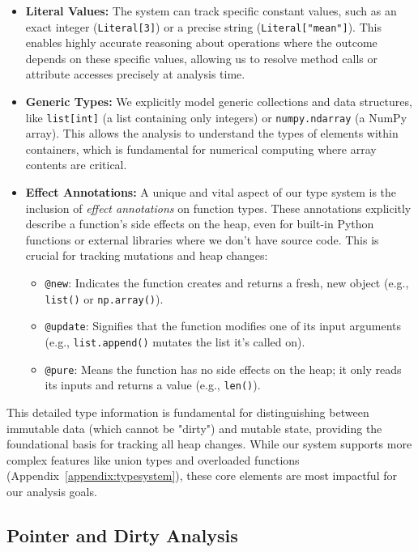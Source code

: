\begin{itemize}
    \item \textbf{Literal Values:} The system can track specific constant values, such as an exact integer (\texttt{Literal[3]}) or a precise string (\texttt{Literal["mean"]}). This enables highly accurate reasoning about operations where the outcome depends on these specific values, allowing us to resolve method calls or attribute accesses precisely at analysis time.
    \item \textbf{Generic Types:} We explicitly model generic collections and data structures, like \texttt{list[int]} (a list containing only integers) or \texttt{numpy.ndarray} (a NumPy array). This allows the analysis to understand the types of elements within containers, which is fundamental for numerical computing where array contents are critical.
    \item \textbf{Effect Annotations:} A unique and vital aspect of our type system is the inclusion of \emph{effect annotations} on function types. These annotations explicitly describe a function's side effects on the heap, even for built-in Python functions or external libraries where we don't have source code. This is crucial for tracking mutations and heap changes:
    \begin{itemize}
        \item \texttt{@new}: Indicates the function creates and returns a fresh, new object (e.g., \texttt{list()} or \texttt{np.array()}).
        \item \texttt{@update}: Signifies that the function modifies one of its input arguments (e.g., \texttt{list.append()} mutates the list it's called on).
        \item \texttt{@pure}: Means the function has no side effects on the heap; it only reads its inputs and returns a value (e.g., \texttt{len()}).
    \end{itemize}
\end{itemize}
This detailed type information is fundamental for distinguishing between immutable data (which cannot be "dirty") and mutable state, providing the foundational basis for tracking all heap changes. While our system supports more complex features like union types and overloaded functions (Appendix~\ref{appendix:typesystem}), these core elements are most impactful for our analysis goals.

\subsection{Pointer and Dirty Analysis}

